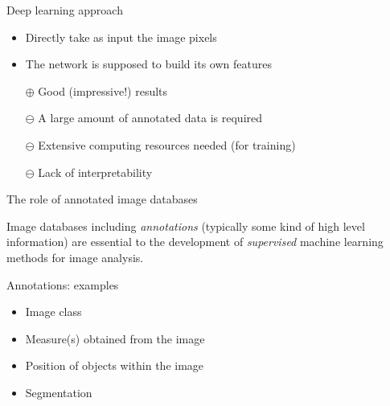 \documentclass[xcolor=pdftex,dvipsnames,table,mathserif]{beamer}
\begin{document}
\begin{frame}{Deep learning approach}

  \begin{block}{}
    \begin{itemize}
    \item Directly take as input the image pixels
    \item The network is supposed to build its own features
    \end{itemize}
  \end{block}

  \begin{itemize}
  \item[\boldmath$\oplus$] Good (impressive!) results
  \item[\boldmath$\ominus$] A large amount of annotated data is required
  \item[\boldmath$\ominus$] Extensive computing resources needed (for training)
  \item[\boldmath$\ominus$] Lack of interpretability
  \end{itemize}

\end{frame}

\begin{frame}{The role of annotated image databases}

  Image databases including \emph{annotations} (typically some kind of high level information) are essential to the development of \emph{supervised} machine learning methods for image analysis.

  \begin{block}{Annotations: examples}
    \begin{itemize}
    \item Image class
    \item Measure(s) obtained from the image
    \item Position of objects within the image
    \item Segmentation
    \end{itemize}
  \end{block}

\end{frame}
\end{document}
